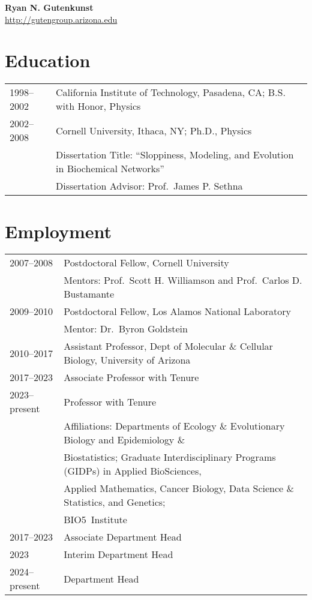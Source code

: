 \documentclass[11pt]{article}
\begin{document}
\begin{center}
\textbf{\Large Ryan N. Gutenkunst}\\
\url{http://gutengroup.arizona.edu}\\
\end{center}

\section*{Education}
\begin{longtable}[l]{l l}
1998--2002 & California Institute of Technology, Pasadena, CA; B.S. with Honor, Physics\\
2002--2008 & Cornell University, Ithaca, NY; Ph.D., Physics\\
          & Dissertation Title: ``Sloppiness, Modeling, and Evolution in Biochemical Networks''\\
          & Dissertation Advisor: Prof.\ James P. Sethna
\end{longtable}

\section*{Employment}
\begin{longtable}[l]{l l}
2007--2008 & Postdoctoral Fellow, Cornell University\\%
          & Mentors: Prof.\ Scott H. Williamson and Prof.\ Carlos D. Bustamante\\
2009--2010 & Postdoctoral Fellow, Los Alamos National Laboratory\\%
          & Mentor: Dr.\ Byron Goldstein\\
2010--2017 & Assistant Professor, Dept of Molecular \& Cellular Biology, University of Arizona\\
2017--2023 & Associate Professor with Tenure\\
2023--present & Professor with Tenure\\
& Affiliations: Departments of Ecology \& Evolutionary Biology and Epidemiology \&\\
&Biostatistics; Graduate Interdisciplinary Programs (GIDPs) in Applied BioSciences,\\
&Applied Mathematics, Cancer Biology, Data Science \& Statistics, and Genetics;\\
&BIO5~Institute\\
2017--2023 & Associate Department Head\\
2023 & Interim Department Head\\
2024--present & Department Head\\
\end{longtable}
\end{document}
